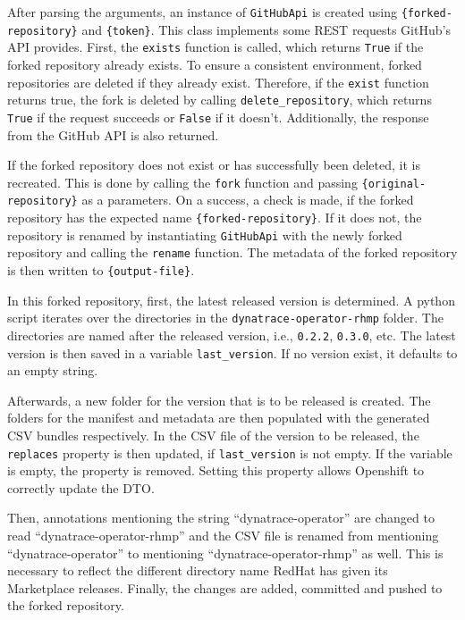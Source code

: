 After parsing the arguments, an instance of \verb|GitHubApi| is created using \verb|{forked-repository}| and \verb|{token}|.
This class implements some REST requests GitHub's API provides.
First, the \verb|exists| function is called, which returns \verb|True| if the forked repository already exists.
To ensure a consistent environment, forked repositories are deleted if they already exist.
Therefore, if the \verb|exist| function returns true, the fork is deleted by calling \verb|delete_repository|, which returns \verb|True| if the request succeeds or \verb|False| if it doesn't.
Additionally, the response from the GitHub API is also returned.

If the forked repository does not exist or has successfully been deleted, it is recreated.
This is done by calling the \verb|fork| function and passing \verb|{original-repository}| as a parameters.
On a success, a check is made, if the forked repository has the expected name \verb|{forked-repository}|.
If it does not, the repository is renamed by instantiating \verb|GitHubApi| with the newly forked repository and calling the \verb|rename| function.
The metadata of the forked repository is then written to \verb|{output-file}|.

In this forked repository, first, the latest released version is determined.
A python script iterates over the directories in the \verb|dynatrace-operator-rhmp| folder.
The directories are named after the released version, i.e., \verb|0.2.2|, \verb|0.3.0|, etc.
The latest version is then saved in a variable \verb|last_version|.
If no version exist, it defaults to an empty string.

Afterwards, a new folder for the version that is to be released is created.
The folders for the manifest and metadata are then populated with the generated CSV bundles respectively.
In the CSV file of the version to be released, the \verb|replaces| property is then updated, if \verb|last_version| is not empty.
If the variable is empty, the property is removed.
Setting this property allows Openshift to correctly update the DTO.

Then, annotations mentioning the string ``dynatrace-operator'' are changed to read ``dynatrace-operator-rhmp'' and the CSV file is renamed from  mentioning ``dynatrace-operator'' to mentioning ``dynatrace-operator-rhmp'' as well.
This is necessary to reflect the different directory name RedHat has given its Marketplace releases.
Finally, the changes are added, committed and pushed to the forked repository.
